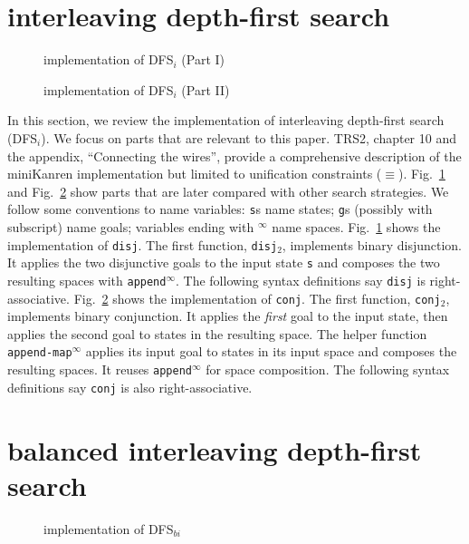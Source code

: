 \documentclass[acmlarge, review=true]{acmart}
\newcommand{\conj}{\texttt{conj}}
\newcommand{\disj}{\texttt{disj}}
\newcommand{\disjtwo}{\texttt{disj$_2$}}
\newcommand{\conjtwo}{\texttt{conj$_2$}}
\newcommand{\appendInf}{\texttt{append$^\infty$}}
\newcommand{\appendMapInf}{\texttt{append-map$^\infty$}}
\newcommand{\DFSi }[0]{DFS$_{i}$}
\newcommand{\DFSbi}[0]{DFS$_{bi}$}
\begin{document}
\section{interleaving depth-first search}

\begin{figure}
	
	\caption{implementation of \DFSi{} (Part I)}
	\label{DFSi-0}
\end{figure}

\begin{figure}
	
	\caption{implementation of \DFSi{} (Part II)}
	\label{DFSi-1}
\end{figure}

In this section, we review the implementation of interleaving depth-first 
search (\DFSi). We focus on parts that are relevant to this paper. TRS2,
chapter 10 and the appendix, ``Connecting the wires'', 
provide a comprehensive description of the miniKanren 
implementation but limited to unification constraints ($\equiv$).
Fig.~\ref{DFSi-0} and Fig.~\ref{DFSi-1} show parts that are later compared 
with other search strategies. We follow some conventions to name variables: 
\texttt{s}s name states; \texttt{g}s (possibly with subscript) name goals; 
variables ending with $^\infty$ name spaces. Fig.~\ref{DFSi-0} shows 
the 
implementation of \disj. The 
first function, \disjtwo, implements binary disjunction. It applies the 
two disjunctive goals to the input state \texttt{s} and composes the two 
resulting spaces with \appendInf{}. The following syntax 
definitions say \disj{} is right-associative. Fig.~\ref{DFSi-1} 
shows the implementation of \conj. The first function, \conjtwo{}, 
implements binary conjunction. 
It applies the \emph{first} goal to the input state, then applies the second 
goal to states in the resulting space. The helper function 
\appendMapInf{} applies its input goal to states 
in its input space and composes the resulting spaces. It reuses 
\appendInf{} for space composition. The following syntax 
definitions say \conj{} is also right-associative.

\section{balanced interleaving depth-first search}

\begin{figure}
	
	\caption{implementation of \DFSbi{}}
	\label{balanced-disj}
\end{figure}
\end{document}
